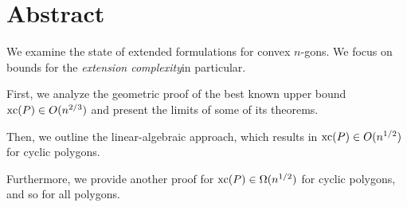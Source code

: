 \section*{Abstract}

We examine the state of extended formulations for convex $n$-gons. We focus on bounds for the \emph{extension complexity}in particular.

First, we analyze the geometric proof of the best known upper bound $\operatorname{xc}(P) \in O(n^{2/3})$ and present the limits of some of its theorems.

Then, we outline the linear-algebraic approach, which results in $\operatorname{xc}(P) \in O(n^{1/2})$ for cyclic polygons.

Furthermore, we provide another proof for $\operatorname{xc}(P) \in \Omega(n^{1/2})$ for cyclic polygons, and so for all polygons.
